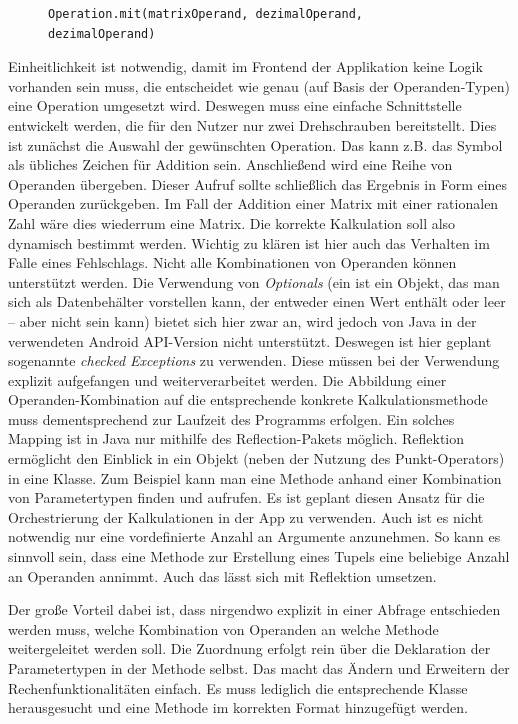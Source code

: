 \begin{figure}[bht]
	\begin{lstlisting}[caption=Konzept für Nutzung generischer Schnittstelle, label=list:konzept-fuer-nutzung-generischer-schnittstelle]
Operation.mit(matrixOperand, dezimalOperand, dezimalOperand)
	\end{lstlisting}    
\end{figure}

Einheitlichkeit ist notwendig, damit im Frontend der Applikation keine Logik vorhanden sein muss, die entscheidet wie genau (auf Basis der Operanden-Typen) eine Operation umgesetzt wird. Deswegen muss eine einfache Schnittstelle entwickelt werden, die für den Nutzer nur zwei Drehschrauben bereitstellt. Dies ist zunächst die Auswahl der gewünschten Operation. Das kann z.B. das Symbol \code{+} als übliches Zeichen für Addition sein. Anschließend wird eine Reihe von Operanden übergeben. Dieser Aufruf sollte schließlich das Ergebnis in Form eines Operanden zurückgeben. Im Fall der Addition einer Matrix mit einer rationalen Zahl wäre dies wiederrum eine Matrix. Die korrekte Kalkulation soll also dynamisch bestimmt werden. Wichtig zu klären ist hier auch das Verhalten im Falle eines Fehlschlags. Nicht alle Kombinationen von Operanden können unterstützt werden. Die Verwendung von \textit{Optionals} (ein  ist ein Objekt, das man sich als Datenbehälter vorstellen kann, der entweder einen Wert enthält oder leer – aber nicht  sein kann) bietet sich hier zwar an, wird jedoch von Java in der verwendeten Android API-Version nicht unterstützt. Deswegen ist hier geplant sogenannte \textit{checked Exceptions} zu verwenden. Diese müssen bei der Verwendung explizit aufgefangen und weiterverarbeitet werden. Die Abbildung einer Operanden-Kombination auf die entsprechende konkrete Kalkulationsmethode muss dementsprechend zur Laufzeit des Programms erfolgen. Ein solches Mapping ist in Java nur mithilfe des Reflection-Pakets möglich. Reflektion ermöglicht den Einblick in ein Objekt (neben der Nutzung des Punkt-Operators) in eine Klasse. Zum Beispiel kann man eine Methode anhand einer Kombination von Parametertypen finden und aufrufen. Es ist geplant diesen Ansatz für die Orchestrierung der Kalkulationen in der App zu verwenden. Auch ist es nicht notwendig nur eine vordefinierte Anzahl an Argumente anzunehmen. So kann es sinnvoll sein, dass eine Methode zur Erstellung eines Tupels eine beliebige Anzahl an Operanden annimmt. Auch das lässt sich mit Reflektion umsetzen.

Der große Vorteil dabei ist, dass nirgendwo explizit in einer Abfrage entschieden werden muss, welche Kombination von Operanden an welche Methode weitergeleitet werden soll. Die Zuordnung erfolgt rein über die Deklaration der Parametertypen in der Methode selbst. Das macht das Ändern und Erweitern der Rechenfunktionalitäten einfach. Es muss lediglich die entsprechende Klasse herausgesucht und eine Methode im korrekten Format hinzugefügt werden. 

